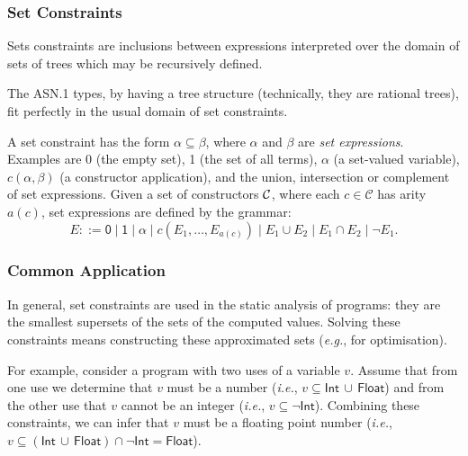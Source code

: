 \documentclass[compress,dvips,xcolor={dvipsnames},t]{beamer}
\newcommand\ASN{\textsf{ASN.1}\xspace}
\begin{document}
\begin{frame}
\frametitle{Set Constraints}

Sets constraints are inclusions between expressions interpreted over
the domain of sets of trees which may be recursively defined.

\medskip

The \ASN types, by having a tree structure (technically, they are
rational trees), fit perfectly in the usual domain of set
constraints.

\medskip


A set constraint has the form $\alpha \subseteq \beta$, where $\alpha$
and $\beta$ are \emph{set expressions}. Examples are \textsf{0} (the
empty set), \textsf{1} (the set of all terms), $\alpha$ (a set-valued
variable), $c(\alpha, \beta)$ (a constructor application), and the
union, intersection or complement of set expressions. Given a set of
constructors ${\cal C}$, where each $c \in \mathcal{C}$ has arity
$a(c)$, set expressions are defined by the grammar:
\begin{equation*}
E ::= \textsf{0} \mid \textsf{1} \mid \alpha \mid c (E_1, \ldots,
E_{a(c)}) \mid E_1 \cup E_2 \mid E_1 \cap E_2 \mid \neg E_1.
\end{equation*}

\end{frame}

\begin{frame}
\frametitle{Common Application}

In general, set constraints are used in the static analysis of
programs: they are the smallest supersets of the sets of the computed
values. Solving these constraints means constructing these
approximated sets (\emph{e.g.}, for optimisation).

\medskip

For example, consider a program with two uses of a variable
$v$. Assume that from one use we determine that $v$ must be a number
(\emph{i.e.}, $v \subseteq \textsf{Int} \, \cup \, \textsf{Float}$)
and from the other use that $v$ cannot be an integer (\emph{i.e.}, $v
\subseteq \neg\textsf{Int}$). Combining these constraints, we can
infer that $v$ must be a floating point number (\emph{i.e.}, $v
\subseteq (\textsf{Int} \, \cup \, \textsf{Float}) \cap
\neg\textsf{Int} = \textsf{Float}$).

\end{frame}
\end{document}
